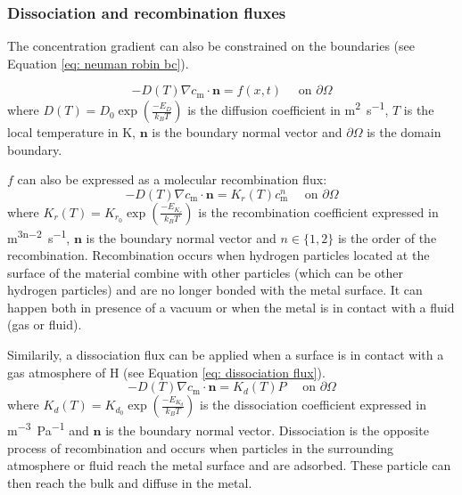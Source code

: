 \subsubsection{Dissociation and recombination fluxes}

The concentration gradient can also be constrained on the boundaries (see Equation \ref{eq: neuman robin bc}).

\begin{equation}
    - D(T)\nabla c_\mathrm{m} \cdot \mathbf{n} = f(x, t) \quad \text { on } \partial \Omega
    \label{eq: neuman robin bc}
\end{equation}
where $D(T) = D_0 \exp(\frac{-E_D}{k_B T}) $ is the diffusion coefficient in \si{m^2.s^{-1}}, $T$ is the local temperature in \si{K}, $\mathbf{n}$ is the boundary normal vector and $\partial \Omega$ is the domain boundary.

$f$ can also be expressed as a molecular recombination flux:
\begin{equation}
    - D(T)\nabla c_\mathrm{m} \cdot \mathbf{n} = K_r(T) c_\mathrm{m}^n \quad \text { on } \partial \Omega
    \label{eq: recombination flux}
\end{equation}
where $K_r(T) = K_{r_0} \exp(\frac{-E_{K_r}}{k_B T}) $ is the recombination coefficient expressed in \si{m^{3n-2}.s^{-1}}, $\mathbf{n}$ is the boundary normal vector and $n \in \{1, 2\}$ is the order of the recombination.
Recombination occurs when hydrogen particles located at the surface of the material combine with other particles (which can be other hydrogen particles) and are no longer bonded with the metal surface.
It can happen both in presence of a vacuum or when the metal is in contact with a fluid (gas or fluid).

Similarily, a dissociation flux can be applied when a surface is in contact with a gas atmosphere of H (see Equation \ref{eq: dissociation flux}).
\begin{equation}
    - D(T)\nabla c_\mathrm{m} \cdot \mathbf{n} = K_d(T) P \quad \text { on } \partial \Omega
    \label{eq: dissociation flux}
\end{equation}
where $K_d(T) = K_{d_0} \exp(\frac{-E_{K_d}}{k_B T}) $ is the dissociation coefficient expressed in \si{m^{-3}.Pa^{-1}} and $\mathbf{n}$ is the boundary normal vector.
Dissociation is the opposite process of recombination and occurs when particles in the surrounding atmosphere or fluid reach the metal surface and are adsorbed.
These particle can then reach the bulk and diffuse in the metal.

